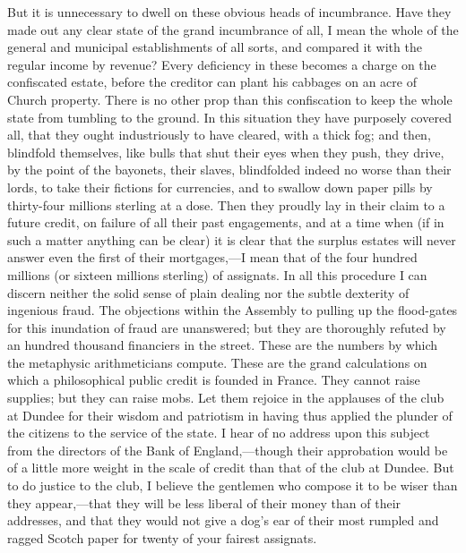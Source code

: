 But it is unnecessary to dwell on these obvious heads of incumbrance. Have they made out any clear state of the grand incumbrance of all, I mean the whole of the general and municipal establishments of all sorts, and compared it with the regular income by revenue? Every deficiency in these becomes a charge on the confiscated estate, before the creditor can plant his cabbages on an acre of Church property. There is no other prop than this confiscation to keep the whole state from tumbling to the ground. In this situation they have purposely covered all, that they ought industriously to have cleared, with a thick fog; and then, blindfold themselves, like bulls that shut their eyes when they push, they drive, by the point of the bayonets, their slaves, blindfolded indeed no worse than their lords, to take their fictions for currencies, and to swallow down paper pills by thirty-four millions sterling at a dose. Then they proudly lay in their claim to a future credit, on failure of all their past engagements, and at a time when (if in such a matter anything can be clear) it is clear that the surplus estates will never answer even the first of their mortgages,—I mean that of the four hundred millions (or sixteen millions sterling) of assignats. In all this procedure I can discern neither the solid sense of plain dealing nor the subtle dexterity of ingenious fraud. The objections within the Assembly to pulling up the flood-gates for this inundation of fraud are unanswered; but they are thoroughly refuted by an hundred thousand financiers in the street. These are the numbers by which the metaphysic arithmeticians compute. These are the grand calculations on which a philosophical public credit is founded in France. They cannot raise supplies; but they can raise mobs. Let them rejoice in the applauses of the club at Dundee for their wisdom and patriotism in having thus applied the plunder of the citizens to the service of the state. I hear of no address upon this subject from the directors of the Bank of England,—though their approbation would be of a little more weight in the scale of credit than that of the club at Dundee. But to do justice to the club, I believe the gentlemen who compose it to be wiser than they appear,—that they will be less liberal of their money than of their addresses, and that they would not give a dog's ear of their most rumpled and ragged Scotch paper for twenty of your fairest assignats.

